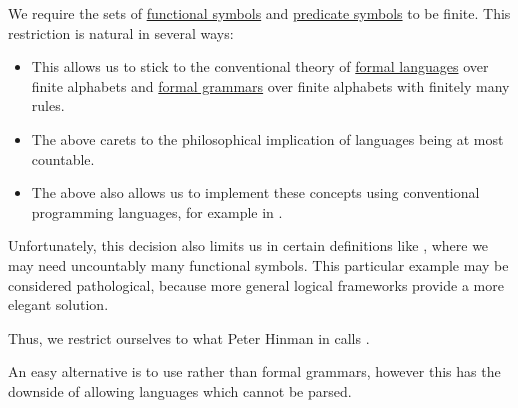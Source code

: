 \begin{remark}\label{rem:uncountable_first_order_language}
  We require the sets of \hyperref[def:first_order_language/fun]{functional symbols} and \hyperref[def:first_order_language/fun]{predicate symbols} to be finite. This restriction is natural in several ways:
  \begin{itemize}
    \item This allows us to stick to the conventional theory of \hyperref[def:formal_language/language]{formal languages} over finite alphabets and \hyperref[def:formal_grammar]{formal grammars} over finite alphabets with finitely many rules.

    \item The above carets to the philosophical implication of languages being at most countable.

    \item The above also allows us to implement these concepts using conventional programming languages, for example in \cite{code}.
  \end{itemize}

  Unfortunately, this decision also limits us in certain definitions like , where we may need uncountably many functional symbols. This particular example may be considered pathological, because more general logical frameworks provide a more elegant solution.

  Thus, we restrict ourselves to what Peter Hinman in  calls .

  An easy alternative is to use  rather than formal grammars, however this has the downside of allowing languages which cannot be parsed.
\end{remark}

